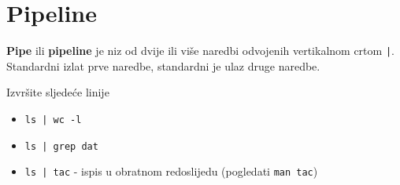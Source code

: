 \section*{Pipeline}

\textbf{Pipe} ili \textbf{pipeline} je niz od dvije ili više naredbi odvojenih vertikalnom crtom \lstinline!|!. Standardni izlat prve naredbe, standardni je ulaz druge naredbe.


\begin{zadatak} Izvršite sljedeće linije
\begin{itemize}
\item \lstinline!ls | wc -l!
\item \lstinline!ls | grep dat!
\item \lstinline!ls | tac! - ispis u obratnom redoslijedu (pogledati \texttt{man tac})

\end{itemize}
\end{zadatak}
